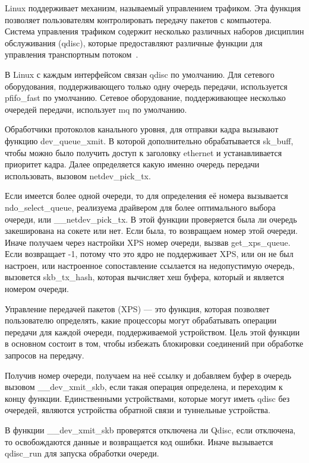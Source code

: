 Linux поддерживает механизм, называемый управлением трафиком. Эта функция позволяет пользователям контролировать передачу пакетов с компьютера. Система управления трафиком содержит несколько различных наборов дисциплин обслуживания (qdisc), которые предоставляют различные функции для управления транспортным потоком~\cite{send}. 

В Linux с каждым интерфейсом связан qdisc по умолчанию. Для сетевого оборудования, поддерживающего только одну очередь передачи, используется pfifo\_fast по умолчанию. Сетевое оборудование, поддерживающее несколько очередей передачи, использует mq по умолчанию.

Обработчики протоколов канального уровня, для отправки кадра вызывают функцию dev\_queue\_xmit. В которой дополнительно обрабатывается sk\_buff, чтобы можно было получить доступ к заголовку ethernet и устанавливается приоритет кадра. Далее определяется какую именно очередь передачи использовать, вызовом netdev\_pick\_tx.

Если имеется более одной очереди, то для определения её номера вызывается ndo\_select\_queue, реализуема драйвером для более оптимального выбора очереди, или \_\_netdev\_pick\_tx. В этой функции проверяется была ли очередь закеширована на сокете или нет. Если была, то возвращаем номер этой очереди. Иначе получаем через настройки XPS номер очереди, вызвав get\_xps\_queue. Если возвращает  -1, потому что это ядро не поддерживает XPS, или он не был настроен, или настроенное сопоставление ссылается на недопустимую очередь, вызовется skb\_tx\_hash, которая вычисляет хеш буфера, который и является номером очереди.

Управление передачей пакетов (XPS) --- это функция, которая позволяет пользователю определять, какие процессоры могут обрабатывать операции передачи для каждой очереди, поддерживаемой устройством. Цель этой функции в основном состоит в том, чтобы избежать блокировки соединений при обработке запросов на передачу.

Получив номер очереди, получаем на неё ссылку и добавляем буфер в очередь вызовом \_\_dev\_xmit\_skb, если такая операция определена, и переходим к концу функции. Единственными устройствами, которые могут иметь qdisc без очередей, являются устройства обратной связи и туннельные устройства.

В функции \_\_dev\_xmit\_skb проверятся отключена ли Qdisc, если отключена, то освобождаются данные и возвращается код ошибки. Иначе вызывается qdisc\_run для запуска обработки очереди.

